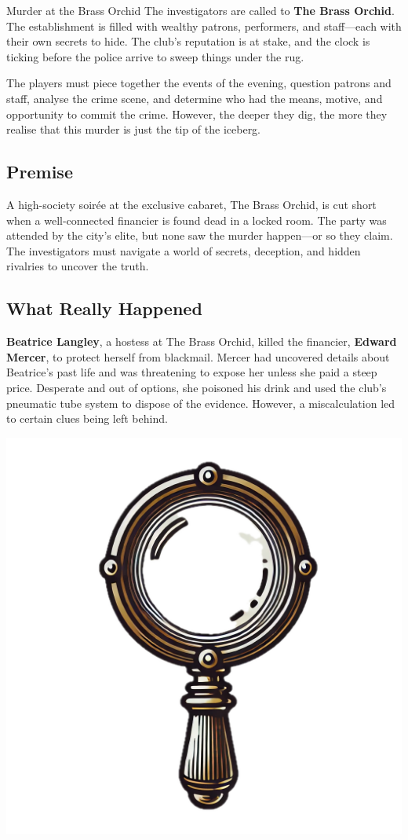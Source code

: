 
\begin{WyrdScenarioHeading}{Murder at the Brass Orchid}
	The investigators are called to \textbf{The Brass Orchid}. The establishment is filled with wealthy patrons, performers, and staff—each with their own secrets to hide. The club’s reputation is at stake, and the clock is ticking before the police arrive to sweep things under the rug.

	The players must piece together the events of the evening, question patrons and staff, analyse the crime scene, and determine who had the means, motive, and opportunity to commit the crime. However, the deeper they dig, the more they realise that this murder is just the tip of the iceberg.

	\subsection*{Premise} 
	A high-society soirée at the exclusive cabaret, The Brass Orchid, is cut short when a well-connected financier is found dead in a locked room. The party was attended by the city's elite, but none saw the murder happen—or so they claim. The investigators must navigate a world of secrets, deception, and hidden rivalries to uncover the truth.

	\subsection*{What Really Happened} 
	\textbf{Beatrice Langley}, a hostess at The Brass Orchid, killed the financier, \textbf{Edward Mercer}, to protect herself from blackmail. Mercer had uncovered details about Beatrice’s past life and was threatening to expose her unless she paid a steep price. Desperate and out of options, she poisoned his drink and used the club’s pneumatic tube system to dispose of the evidence. However, a miscalculation led to certain clues being left behind.
\end{WyrdScenarioHeading}

\begin{center}
	\includegraphics[width=.5\linewidth]{img/separt/detective-glass}
\end{center}

